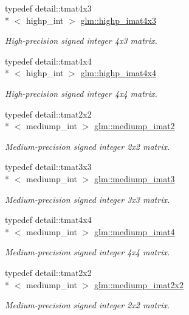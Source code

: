 \begin{DoxyCompactItemize}
typedef detail\-::tmat4x3\\*
$<$ highp\-\_\-int $>$ \hyperlink{group__gtc__matrix__integer_gaf644a447ba64f23d2245f0a3cac9cc74}{glm\-::highp\-\_\-imat4x3}
\begin{DoxyCompactList}\small\item\em High-\/precision signed integer 4x3 matrix. \end{DoxyCompactList}\item 
typedef detail\-::tmat4x4\\*
$<$ highp\-\_\-int $>$ \hyperlink{group__gtc__matrix__integer_gaff23c95b5feea2b2352b377810783823}{glm\-::highp\-\_\-imat4x4}
\begin{DoxyCompactList}\small\item\em High-\/precision signed integer 4x4 matrix. \end{DoxyCompactList}\item 
typedef detail\-::tmat2x2\\*
$<$ mediump\-\_\-int $>$ \hyperlink{group__gtc__matrix__integer_ga44c16e631d0b5ab68098131183c7e096}{glm\-::mediump\-\_\-imat2}
\begin{DoxyCompactList}\small\item\em Medium-\/precision signed integer 2x2 matrix. \end{DoxyCompactList}\item 
typedef detail\-::tmat3x3\\*
$<$ mediump\-\_\-int $>$ \hyperlink{group__gtc__matrix__integer_gacb4d126bfdbc9d292e7cdfe6f3e481e6}{glm\-::mediump\-\_\-imat3}
\begin{DoxyCompactList}\small\item\em Medium-\/precision signed integer 3x3 matrix. \end{DoxyCompactList}\item 
typedef detail\-::tmat4x4\\*
$<$ mediump\-\_\-int $>$ \hyperlink{group__gtc__matrix__integer_ga49908c8634fad44d78f09c3876c944db}{glm\-::mediump\-\_\-imat4}
\begin{DoxyCompactList}\small\item\em Medium-\/precision signed integer 4x4 matrix. \end{DoxyCompactList}\item 
typedef detail\-::tmat2x2\\*
$<$ mediump\-\_\-int $>$ \hyperlink{group__gtc__matrix__integer_gaf330f41983ed0d499d18277a44a54720}{glm\-::mediump\-\_\-imat2x2}
\begin{DoxyCompactList}\small\item\em Medium-\/precision signed integer 2x2 matrix. \end{DoxyCompactList}\item 

\end{DoxyCompactItemize}
